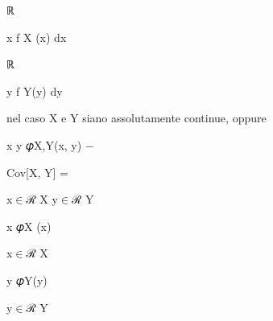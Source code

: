 \documentclass[a4paper,portrait,12pt]{article}
\begin{document}
\begin{flushleft}
ℝ
\end{flushleft}





\begin{flushleft}
x f X (x) dx
\end{flushleft}





\begin{flushleft}
ℝ
\end{flushleft}





\begin{flushleft}
y f Y(y) dy
\end{flushleft}





\begin{flushleft}
nel caso X e Y siano assolutamente continue, oppure
\end{flushleft}


\begin{flushleft}
x y 𝜑X,Y(x, y) $-$
\end{flushleft}





\begin{flushleft}
Cov[X, Y] =
\end{flushleft}


\begin{flushleft}
x$\in$ℛ X y$\in$ℛ Y
\end{flushleft}





\begin{flushleft}
x 𝜑X (x)
\end{flushleft}


\begin{flushleft}
x$\in$ℛ X
\end{flushleft}





\begin{flushleft}
y 𝜑Y(y)
\end{flushleft}


\begin{flushleft}
y$\in$ℛ Y
\end{flushleft}
\end{document}
